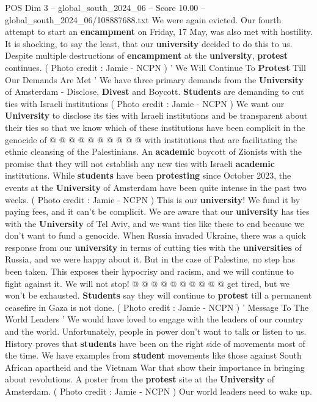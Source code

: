 \begin{textsample}{POS Dim 3 – global\_south\_2024\_06 – Score 10.00 – global\_south\_2024\_06/108887688.txt}
We were again evicted.
Our fourth attempt to start an \textbf{encampment} on Friday, 17 May, was also met with hostility.
It is shocking, to say the least, that our \textbf{university} decided to do this to us.
Despite multiple destructions of \textbf{encampment} at the \textbf{university}, \textbf{protest} continues. ( Photo credit : Jamie - NCPN ) ' We Will Continue To \textbf{Protest} Till Our Demands Are Met ' We have three primary demands from the \textbf{University} of Amsterdam - Disclose, \textbf{Divest} and Boycott. \textbf{Students} are demanding to cut ties with Israeli institutions ( Photo credit : Jamie - NCPN ) We want our \textbf{University} to disclose its ties with Israeli institutions and be transparent about their ties so that we know which of these institutions have been complicit in the genocide of @ @ @ @ @ @ @ @ @ @ with institutions that are facilitating the ethnic cleansing of the Palestinians.
An \textbf{academic} boycott of Zionists with the promise that they will not establish any new ties with Israeli \textbf{academic} institutions.
While \textbf{students} have been \textbf{protesting} since October 2023, the events at the \textbf{University} of Amsterdam have been quite intense in the past two weeks. ( Photo credit : Jamie - NCPN ) This is our \textbf{university}!
We fund it by paying fees, and it can't be complicit.
We are aware that our \textbf{university} has ties with the \textbf{University} of Tel Aviv, and we want ties like these to end because we don't want to fund a genocide.
When Russia invaded Ukraine, there was a quick response from our \textbf{university} in terms of cutting ties with the \textbf{universities} of Russia, and we were happy about it.
But in the case of Palestine, no step has been taken.
This exposes their hypocrisy and racism, and we will continue to fight against it.
We will not stop! @ @ @ @ @ @ @ @ @ @ get tired, but we won't be exhausted. \textbf{Students} say they will continue to \textbf{protest} till a permanent ceasefire in Gaza is not done. ( Photo credit : Jamie - NCPN ) ' Message To The World Leaders ' We would have loved to engage with the leaders of our country and the world.
Unfortunately, people in power don't want to talk or listen to us.
History proves that \textbf{students} have been on the right side of movements most of the time.
We have examples from \textbf{student} movements like those against South African apartheid and the Vietnam War that show their importance in bringing about revolutions.
A poster from the \textbf{protest} site at the \textbf{University} of Amsterdam. ( Photo credit : Jamie - NCPN ) Our world leaders need to wake up.

\end{textsample}
